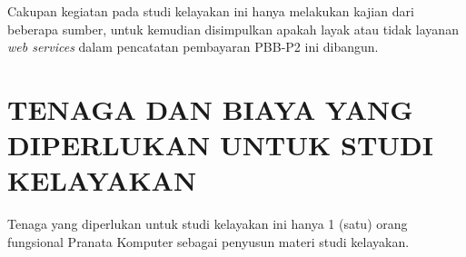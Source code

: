 \documentclass[pdftex, 12pt, oneside]{article}
\begin{document}
Cakupan kegiatan pada studi kelayakan ini hanya melakukan kajian dari beberapa sumber, untuk kemudian disimpulkan apakah layak atau tidak layanan \textit{web services} dalam pencatatan pembayaran PBB-P2 ini dibangun.

\section{TENAGA DAN BIAYA YANG DIPERLUKAN UNTUK STUDI KELAYAKAN}

Tenaga yang diperlukan untuk studi kelayakan ini hanya 1 (satu) orang fungsional Pranata Komputer sebagai penyusun materi studi kelayakan.
\end{document}
